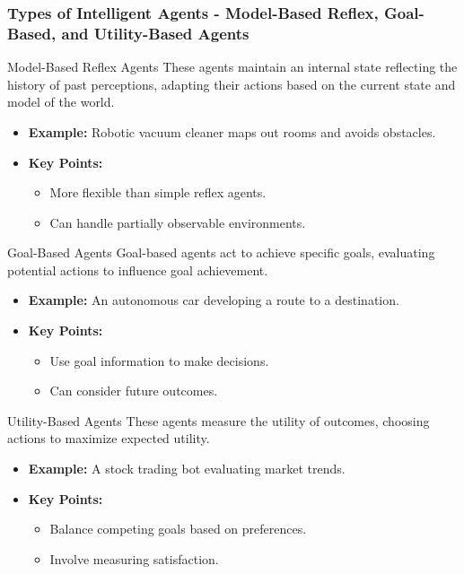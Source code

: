 \documentclass[aspectratio=169]{beamer}
\begin{document}
\begin{frame}[fragile]
    \frametitle{Types of Intelligent Agents - Model-Based Reflex, Goal-Based, and Utility-Based Agents}
    \begin{block}{Model-Based Reflex Agents}
        These agents maintain an internal state reflecting the history of past perceptions, adapting their actions based on the current state and model of the world.
    \end{block}
    \begin{itemize}
        \item \textbf{Example:} Robotic vacuum cleaner maps out rooms and avoids obstacles.
        \item \textbf{Key Points:}
        \begin{itemize}
            \item More flexible than simple reflex agents.
            \item Can handle partially observable environments.
        \end{itemize}
    \end{itemize}

    \begin{block}{Goal-Based Agents}
        Goal-based agents act to achieve specific goals, evaluating potential actions to influence goal achievement.
    \end{block}
    \begin{itemize}
        \item \textbf{Example:} An autonomous car developing a route to a destination.
        \item \textbf{Key Points:}
        \begin{itemize}
            \item Use goal information to make decisions.
            \item Can consider future outcomes.
        \end{itemize}
    \end{itemize}

    \begin{block}{Utility-Based Agents}
        These agents measure the utility of outcomes, choosing actions to maximize expected utility.
    \end{block}
    \begin{itemize}
        \item \textbf{Example:} A stock trading bot evaluating market trends.
        \item \textbf{Key Points:}
        \begin{itemize}
            \item Balance competing goals based on preferences.
            \item Involve measuring satisfaction.
        \end{itemize}
    \end{itemize}
\end{frame}
\end{document}
